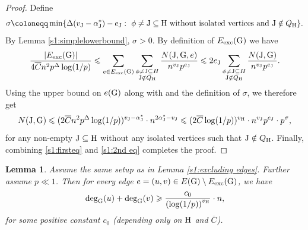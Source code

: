 \documentclass[a4paper,11pt,english,reqno]{amsart}
\numberwithin{equation}{section}
\renewcommand{\leq}{\leqslant}
\renewcommand{\geq}{\geqslant}
\newcommand{\cbar}{\overline{C}}
\newcommand{\uH}{\textup{H}}
\newcommand{\tu}[1]{\textup{#1}}
\newtheorem{lemma}[theorem]{Lemma}
\begin{document}
		\begin{proof}
			Define 
			\[
			\sigma \coloneqq \min\{\Delta(v_{\tu{J}}-\alpha^{*}_{\tu{J}})-e_{\tu{J}}:\ \phi \neq \tu{J}\subseteq \uH \text{ without isolated vertices and $\tu{J}\notin Q_{\uH}$}\}. 
			\]
			By Lemma \ref{s1:simplelowerbound}, $\sigma>0$. By definition of $E_{\text{exc}}(\tu{G})$ we have
			\begin{equation}
				\label{s1:firsteq}
				\frac{|E_{\text{exc}}(\tu{G})|}{4 \cbar n^{2}p^{\Delta}\log(1/p) }\leq\sum_{e\in E_{\text{exc}}(\tu{G})}\sum_{\substack{\phi\neq \tu{J}\subseteq H\\ \tu{J}\notin Q_{\uH}}} \frac{N(\tu{J}, \tu{G}, e)}{n^{v_{\tu{J}}}p^{e_{\tu{J}}}} \leq 2e_{\tu{J}}\sum_{\substack{\phi\neq \tu{J}\subseteq H\\ \tu{J}\notin Q_{\uH}}} \frac{N(\tu{J},\tu{G})}{{n^{v_{\tu{J}}}p^{e_{\tu{J}}}}}.
			\end{equation}
			Using the upper bound on $e(\tu{G})$ %
			along with \cite[Theorem~5.4]{HMS} and the definition of $\sigma$, we therefore get 
			\begin{equation}
				\label{s1:2nd eq}
				N(\tu{J}, \tu{G})\leq (2\cbar n^{2}p^{\Delta}\log(1/p))^{v_{\tu{J}}-\alpha^{*}_{\tu{J}}}\cdot  n^{2\alpha^{*}_{\tu{J}}-v_{\tu{J}}} \leq (2\cbar \log(1/p))^{v_{\uH}}\cdot  {n^{v_{\tu{J}}}p^{e_{\tu{J}}}} \cdot p^{\sigma},
			\end{equation}
			for any non-empty $\tu{J} \subseteq \uH$ without any isolated vertices %
			such that $\tu{J}\notin Q_{\uH}$. Finally, combining \eqref{s1:firsteq} and \eqref{s1:2nd eq} completes the proof.
		\end{proof}
		\begin{lemma}
			\label{s1:sum of degrees}
			Assume the same setup as in Lemma \ref{s1:excluding edges}. Further assume $p\ll1 $. Then for every edge $e=(u,v)\in E(\tu{G})\setminus E_{\text{exc}}(\tu{G})$, we have
			\begin{equation*}
				\textup{deg}_{\tu{G}}(u)+\textup{deg}_{\tu{G}}(v) \geq \frac{c_{0}}{\left(\log(1/p)\right)^{v_{\uH}}}\cdot n,
			\end{equation*}
			for some positive constant $c_{0}$ (depending only on $\uH$ and $\cbar$).
		\end{lemma}
\end{document}
